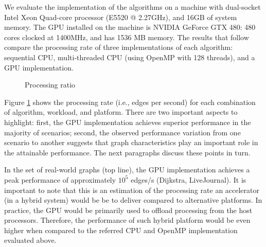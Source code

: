 We evaluate the implementation of the algorithms on a machine with dual-socket Intel Xeon Quad-core processor (E5520 @ 2.27GHz), and 16GB of system memory. The GPU installed on the machine is NVIDIA GeForce GTX 480: 480 cores clocked at 1400MHz, and has 1536 MB memory. The results that follow compare the processing rate of three implementations of each algorithm: sequential CPU, multi-threaded CPU (using OpenMP with 128 threads), and a GPU implementation.

\begin{figure}[ht]
\begin{center}
\mbox{}
\caption{Processing ratio}
\label{fig:rate}
\end{center}
\end{figure}

Figure \ref{fig:rate} shows the processing rate (i.e., edges per second) for each combination of algorithm, workload, and platform. There are two important aspects to highlight: first, the GPU implementation achieves superior performance in the majority of scenarios; second, the observed performance variation from one scenario to another suggests that graph characteristics play an important role in the attainable performance. The next paragraphs discuss these points in turn.

In the set of real-world graphs (top line), the GPU implementation achieves a peak performance of approximately $10^5$ edges/s (Dijkstra, LiveJournal). It is important to note that this is an estimation of the processing rate an accelerator (in a hybrid system) would be be to deliver compared to alternative platforms. In practice, the GPU would be primarily used to offload processing from the host processors. Therefore, the performance of such hybrid platform would be even higher when compared to the referred CPU and OpenMP implementation evaluated above.

